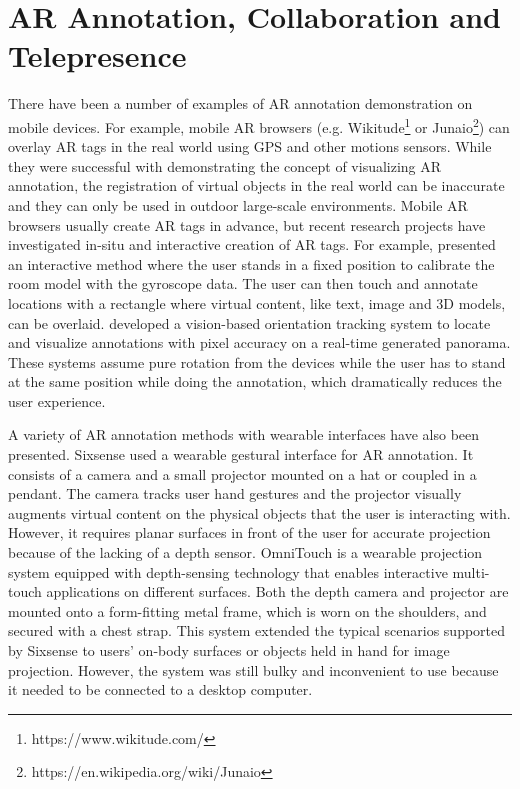 
\section{AR Annotation, Collaboration and Telepresence}

There have been a number of examples of AR annotation demonstration on mobile devices. For example, mobile AR browsers (e.g. Wikitude\footnote{https://www.wikitude.com/} or Junaio\footnote{https://en.wikipedia.org/wiki/Junaio}) can overlay AR tags in the real world using  GPS and other motions sensors. While they were successful with demonstrating the concept of visualizing AR annotation, the registration of virtual objects in the real world can be inaccurate and they can only be used in outdoor large-scale environments. Mobile AR browsers usually create AR tags in advance, but recent research projects have investigated in-situ and interactive creation of AR tags. For example, \cite{Kim:2011:IAS} presented an interactive method where the user stands in a fixed position to calibrate the room model with the gyroscope data. The user can then touch and annotate locations with a rectangle where virtual content, like text, image and 3D models, can be overlaid. \cite{Langlotz:2012:OCP} developed a vision-based orientation tracking system to locate and visualize annotations with pixel accuracy on a real-time generated panorama. These systems assume pure rotation from the devices while the user has to stand at the same position while doing the annotation, which dramatically reduces the user experience.

A variety of AR annotation methods with wearable interfaces have also been presented. Sixsense \cite{Mistry:2009:WWU} used a wearable gestural interface for AR annotation. It consists of a camera and a small projector mounted on a hat or coupled in a pendant. The camera tracks user hand gestures and the projector visually augments virtual content on the physical objects that the user is interacting with. However, it requires planar surfaces in front of the user for accurate projection because of the lacking of a depth sensor. OmniTouch \cite{Harrison:2011:OTW} is a wearable projection system equipped with depth-sensing technology that enables interactive multi-touch applications on different surfaces. Both the depth camera and projector are mounted onto a form-fitting metal frame, which is worn on the shoulders, and secured with a chest strap. This system extended the typical scenarios supported by Sixsense to users' on-body surfaces or objects held in hand for image projection. However, the system was still bulky and inconvenient to use because it needed to be connected to a desktop computer.

